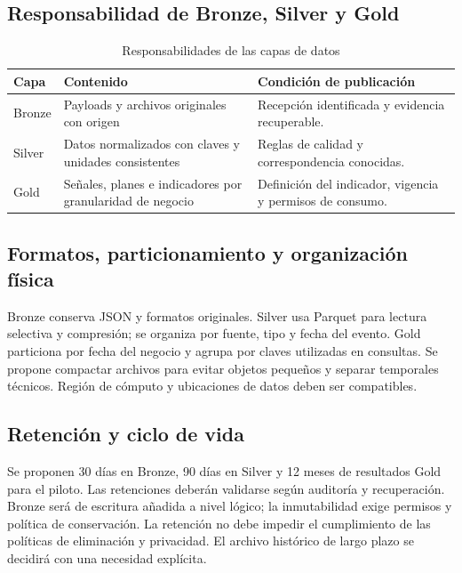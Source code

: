 \documentclass[11pt,a4paper]{article}
\begin{document}
\subsection{Responsabilidad de Bronze, Silver y Gold}
\begin{table}[H]
\caption{Responsabilidades de las capas de datos}\label{tab:medallion}
\small\begin{tabularx}{\linewidth}{@{}P{.14\linewidth}YY@{}}\toprule
Capa & Contenido & Condición de publicación\\\midrule
Bronze & Payloads y archivos originales con origen & Recepción identificada y evidencia recuperable.\\
Silver & Datos normalizados con claves y unidades consistentes & Reglas de calidad y correspondencia conocidas.\\
Gold & Señales, planes e indicadores por granularidad de negocio & Definición del indicador, vigencia y permisos de consumo.\\\bottomrule
\end{tabularx}
\end{table}

\LuminaCapas

\subsection{Formatos, particionamiento y organización física}
Bronze conserva JSON y formatos originales. Silver usa Parquet para lectura selectiva y compresión; se organiza por fuente, tipo y fecha del evento. Gold particiona por fecha del negocio y agrupa por claves utilizadas en consultas. Se propone compactar archivos para evitar objetos pequeños y separar temporales técnicos. Región de cómputo y ubicaciones de datos deben ser compatibles.

\subsection{Retención y ciclo de vida}
Se proponen 30 días en Bronze, 90 días en Silver y 12 meses de resultados Gold para el piloto. Las retenciones deberán validarse según auditoría y recuperación. Bronze será de escritura añadida a nivel lógico; la inmutabilidad exige permisos y política de conservación. La retención no debe impedir el cumplimiento de las políticas de eliminación y privacidad. El archivo histórico de largo plazo se decidirá con una necesidad explícita.
\end{document}
